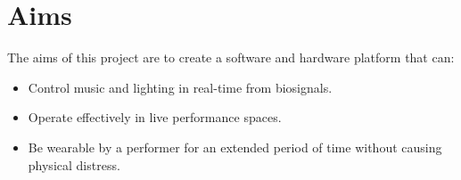 \section{Aims}
The aims of this project are to create a software and hardware platform that can:

\begin{itemize}
        \item Control music and lighting in real-time from biosignals.
        \item Operate effectively in live performance spaces.
        \item Be wearable by a performer for an extended period of time without causing physical distress.
\end{itemize}
